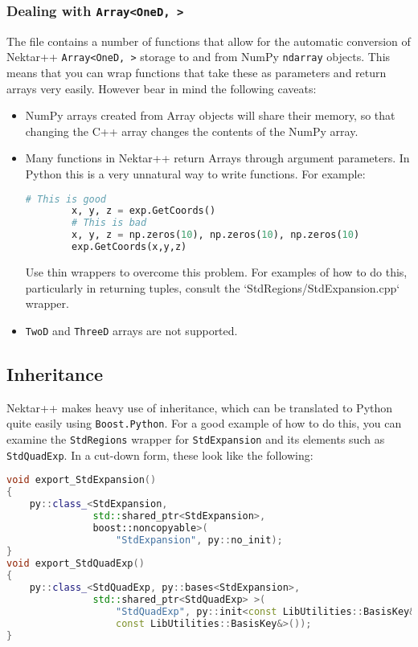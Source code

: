 \subsubsection{Dealing with \texttt{Array<OneD, >}}

The  file contains a number of functions that
allow for the automatic conversion of Nektar++ \texttt{Array<OneD, >} storage to and
from NumPy \texttt{ndarray} objects. This means that you can wrap functions that take
these as parameters and return arrays very easily. However bear in mind the
following caveats:

\begin{itemize}
	\item NumPy arrays created from Array objects will share their memory, so that
  		changing the C++ array changes the contents of the NumPy array.
  \item Many functions in Nektar++ return Arrays through argument parameters. In
  		Python this is a very unnatural way to write functions. For example:
  		\begin{lstlisting}[language=Python]
		# This is good
		x, y, z = exp.GetCoords()
		# This is bad
		x, y, z = np.zeros(10), np.zeros(10), np.zeros(10)
		exp.GetCoords(x,y,z)
		\end{lstlisting}
  		Use thin wrappers to overcome this problem. For examples of how to do this,
  		particularly in returning tuples, consult the `StdRegions/StdExpansion.cpp`
  		wrapper.
	\item \texttt{TwoD} and \texttt{ThreeD} arrays are not supported.
\end{itemize}

\subsection{Inheritance}

Nektar++ makes heavy use of inheritance, which can be translated to Python quite
easily using \texttt{Boost.Python}. For a good example of how to do this, you can
examine the \texttt{StdRegions} wrapper for \texttt{StdExpansion} and its elements such as
\texttt{StdQuadExp}. In a cut-down form, these look like the following:

\begin{lstlisting}[caption={Inheritance with Boost.Python}, label={lst:inheritance}, language=C++]
void export_StdExpansion()
{
    py::class_<StdExpansion,
               std::shared_ptr<StdExpansion>,
               boost::noncopyable>(
                   "StdExpansion", py::no_init);
}
void export_StdQuadExp()
{
    py::class_<StdQuadExp, py::bases<StdExpansion>,
               std::shared_ptr<StdQuadExp> >(
                   "StdQuadExp", py::init<const LibUtilities::BasisKey&,
                   const LibUtilities::BasisKey&>());
}
\end{lstlisting}

